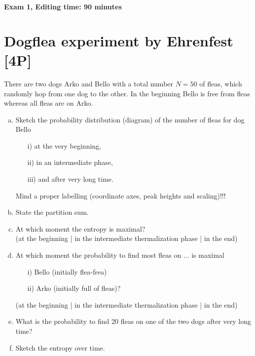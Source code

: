 \documentclass[12pt,a4paper]{article} %
\begin{document}
 
 
 \vspace{1cm}\begin{center}
{\Large \bf Exam 1, Editing time: 90 minutes}
\end{center}

\section{Dogflea experiment by Ehrenfest [4P]}
There are two dogs Arko and Bello with a total number $N = 50$ of fleas, which randomly hop from one dog to the other. In the beginning Bello is free from fleas whereas all fleas are on Arko.
\begin{enumerate}[a)] 
\item Sketch the probability distribution (diagram) of the number of fleas for dog Bello
\begin{itemize}
 \item [i)] at the very beginning,
 \item [ii)] in an intermediate phase,
 \item[iii)] and after very long time.
\end{itemize}
Mind a proper labelling (coordinate axes, peak heights and scaling)!!!

\item State the partition sum.
\item At which moment the entropy is maximal? \\
(at the beginning | in the intermediate thermalization phase | in the end)
\item At which moment the probability to find most fleas on ... is maximal
\begin{itemize}
 \item [i)] Bello (initially flea-frea)
 \item [ii)] Arko (initially full of fleas)?
\end{itemize}
(at the beginning | in the intermediate thermalization phase | in the end)

\item What is the probability to find 20 fleas on one of the two dogs after very long time?\\
\item Sketch the entropy over time.
\end{enumerate}
\end{document}
